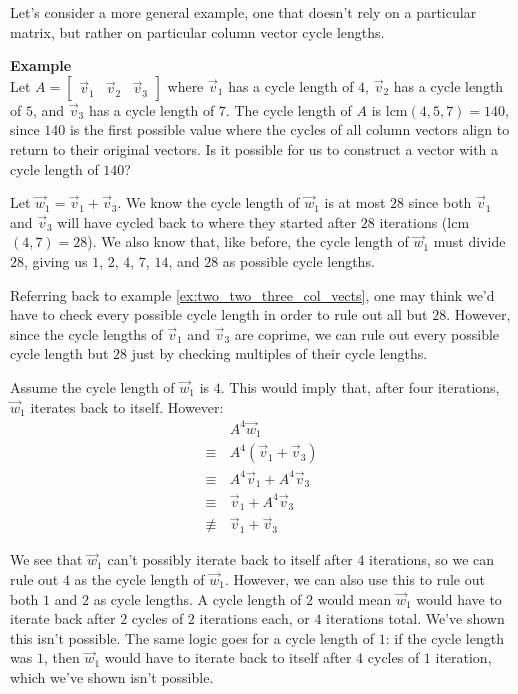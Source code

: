 \documentclass[a4paper, 12pt, reqno]{amsart}
\newcounter{mathexample}[section]
\newenvironment{mathexample}
{
	\refstepcounter{mathexample} %
	\textbf{Example \themathexample} 
	\\
}
{
	\vspace{1cm}
}
\begin{document}
	\vspace{1cm}
	Let's consider a more general example, one that doesn't rely on a particular matrix, but rather
	on particular column vector cycle lengths.
	
	\begin{mathexample}
		\label{ex:general_col_vects}
		Let $A = 
			\begin{bmatrix}
				\vec{v}_{1} & \vec{v}_{2} & \vec{v}_{3}
			\end{bmatrix}
		$
		where $\vec{v}_{1}$ has a cycle length of $4$, $\vec{v}_{2}$ has a cycle length of $5$, 
		and $\vec{v}_{3}$ has a cycle length of $7$. The cycle length of $A$ is 
		$\text{lcm}(4, 5, 7) = 140$, since $140$ is the first possible value where the cycles of 
		all column vectors align to return to their original vectors. Is it possible for us to 
		construct a vector with a cycle length of $140$? 
		
		Let $\vec{w}_{1} = \vec{v}_{1} + \vec{v}_{3}$. We know the cycle length of $\vec{w}_{1}$
		is at most $28$ since both $\vec{v}_{1}$ and $\vec{v}_{3}$ will have cycled back to where
		they started after $28$ iterations (lcm$(4, 7) = 28$). We also know that, like before, 
		the cycle length of $\vec{w}_{1}$ must divide $28$, giving us $1$, $2$, $4$, $7$, $14$, and
		$28$ as possible cycle lengths.
		
		Referring back to example \ref{ex:two_two_three_col_vects}, one may think we'd have to 
		check every possible cycle length in order to rule out all but $28$. However, since the 
		cycle lengths of $\vec{v}_{1}$ and $\vec{v}_{3}$ are coprime, we can rule out every 
		possible cycle length but $28$ just by checking multiples of their cycle lengths.
		
		Assume the cycle length of $\vec{w}_{1}$ is $4$. This would imply that, after four
		iterations, $\vec{w}_{1}$ iterates back to itself. However:
		\begin{align*}
								 & \, A^{4}\vec{w}_{1}                    \\
			\equiv     & \, A^{4}(\vec{v}_{1} + \vec{v}_{3})    \\
			\equiv     & \, A^{4}\vec{v}_{1} + A^{4}\vec{v}_{3} \\
			\equiv     & \, \vec{v}_{1} + A^4\vec{v}_{3}        \\
			\not\equiv & \, \vec{v}_{1} + \vec{v}_{3}
		\end{align*}
		
		We see that $\vec{w}_{1}$ can't possibly iterate back to itself after $4$ iterations,
		so we can rule out $4$ as the cycle length of $\vec{w}_{1}$. However, we can also use this to
		rule out both $1$ and $2$ as cycle lengths. A cycle length of $2$ would mean $\vec{w}_{1}$ would 
		have to iterate back after $2$ cycles of $2$ iterations each, or $4$ iterations total. We've
		shown this isn't possible. The same logic goes for a cycle length of $1$: if the cycle length 
		was $1$, then $\vec{w}_{1}$ would have to iterate back to itself after $4$ cycles of $1$ iteration, 
		which we've shown isn't possible.
		

\end{mathexample}
\end{document}
